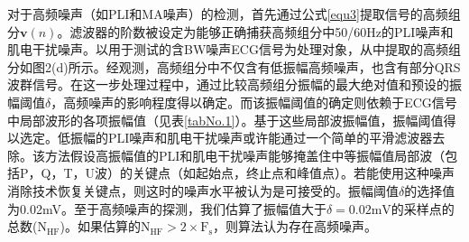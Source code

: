 对于高频噪声（如PLI和MA噪声）的检测，首先通过公式\ref{equ3}提取信号的高频组分$\mathbf{v}(n)$。滤波器的阶数被设定为能够正确捕获高频组分中50/60Hz的PLI噪声和肌电干扰噪声。以用于测试的含BW噪声ECG信号为处理对象，从中提取的高频组分如图2(d)所示。经观测，高频组分中不仅含有低振幅高频噪声，也含有部分QRS波群信号。在这一步处理过程中，通过比较高频组分振幅的最大绝对值和预设的振幅阈值$\delta$，高频噪声的影响程度得以确定。而该振幅阈值的确定则依赖于ECG信号中局部波形的各项振幅值（见表\ref{tabNo.1}）。基于这些局部波振幅值，振幅阈值得以选定。低振幅的PLI噪声和肌电干扰噪声或许能通过一个简单的平滑滤波器去除。该方法假设高振幅值的PLI和肌电干扰噪声能够掩盖住中等振幅值局部波（包括P，Q，T，U波）的关键点（如起始点，终止点和峰值点）。若能使用这种噪声消除技术恢复关键点，则这时的噪声水平被认为是可接受的。振幅阈值$\delta$的选择值为0.02mV。至于高频噪声的探测，我们估算了振幅值大于$\delta=0.02\mathrm{mV}$的采样点的总数($\mathrm{N_{HF}}$)。如果估算的$\mathrm{N_{HF}>2 \times F_s}$，则算法认为存在高频噪声。

